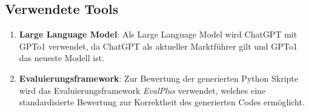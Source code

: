 \documentclass[11pt,a4paper]{article}
\begin{document}
\subsection{Verwendete Tools}
    \begin{enumerate}
        \item \textbf{Large Language Model}: Als Large Language Model wird ChatGPT mit GPTo1 verwendet, da ChatGPT als aktueller Marktführer gilt und GPTo1 das neueste Modell ist.
        \item \textbf{Evaluierungsframework}: Zur Bewertung der generierten Python Skripte wird das Evaluierungsframework \emph{EvalPlus}\cite{evalplus} verwendet, welches eine standardisierte Bewertung zur Korrektheit des generierten Codes ermöglicht.
    \end{enumerate}



\newpage

\printbibliography
\end{document}
